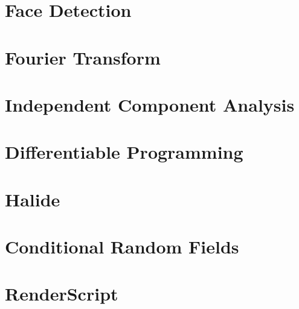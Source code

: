 \section{Face Detection}
\section{Fourier Transform}
\section{Independent Component Analysis}
\section{Differentiable Programming}
\section{Halide}
\section{Conditional Random Fields}
\section{RenderScript}
